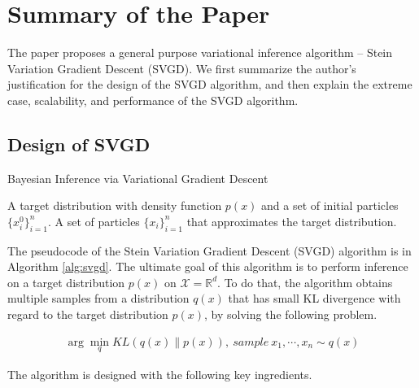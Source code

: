 \section{Summary of the Paper}

The paper proposes a general purpose variational inference algorithm -- Stein Variation Gradient Descent (SVGD).  We first summarize the author's justification for the design of the SVGD algorithm, and then explain the extreme case, scalability, and performance of the SVGD algorithm.

\subsection{Design of SVGD}

\begin{algorithm}[t!]
	\caption{Bayesian Inference via Variational Gradient Descent~\cite{ref_article_svgd}}
	\label{alg:svgd}
	\begin{algorithmic}
		 A target distribution with density function $p(x)$ and a set of initial particles $\{x_i^0\}_{i=1}^n$.
		 A set of particles $\{x_i\}_{i=1}^n$ that approximates the target distribution.
		\ENDFOR
	\end{algorithmic}
\end{algorithm}

The pseudocode of the Stein Variation Gradient Descent (SVGD) algorithm is in Algorithm \ref{alg:svgd}. The ultimate goal of this algorithm is to perform inference on a target distribution $p(x)$ on $\mathcal{X}=\mathbb{R}^d$. To do that, the algorithm obtains multiple samples from a distribution $q(x)$ that has small KL divergence with regard to the target distribution $p(x)$, by solving the following problem.

\begin{align}
    \arg\min_q KL(q(x)\lVert p(x)),\ sample\ x_1,\cdots,x_n\sim q(x)
\end{align}

The algorithm is designed with the following key ingredients.

